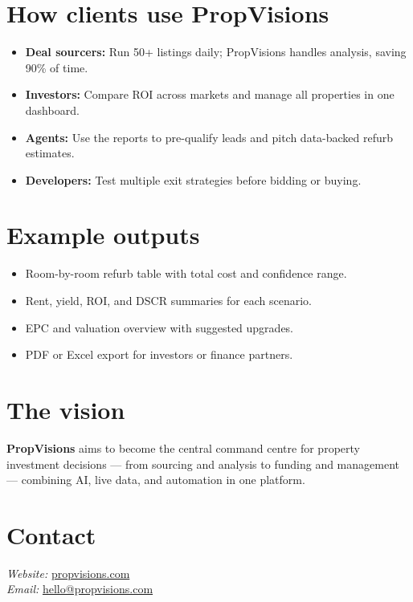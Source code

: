 \documentclass[11pt,a4paper]{article}
\begin{document}
\section*{How clients use PropVisions}
\begin{itemize}
  \item \textbf{Deal sourcers:} Run 50+ listings daily; PropVisions handles analysis, saving 90\% of time.
  \item \textbf{Investors:} Compare ROI across markets and manage all properties in one dashboard.
  \item \textbf{Agents:} Use the reports to pre-qualify leads and pitch data-backed refurb estimates.
  \item \textbf{Developers:} Test multiple exit strategies before bidding or buying.
\end{itemize}

\section*{Example outputs}
\begin{itemize}
  \item Room-by-room refurb table with total cost and confidence range.
  \item Rent, yield, ROI, and DSCR summaries for each scenario.
  \item EPC and valuation overview with suggested upgrades.
  \item PDF or Excel export for investors or finance partners.
\end{itemize}

\section*{The vision}
\textbf{PropVisions} aims to become the central command centre for property investment decisions — from sourcing and analysis to funding and management — combining AI, live data, and automation in one platform.

\section*{Contact}
\textit{Website:} \href{https://www.propvisions.com}{propvisions.com} \\
\textit{Email:} \href{mailto:hello@propvisions.com}{hello@propvisions.com}
\end{document}
